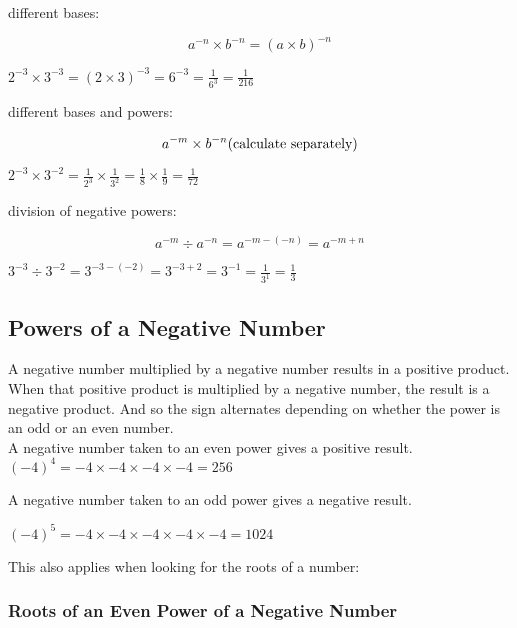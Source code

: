 \documentclass{article}
\begin{document}
different bases:
\begin{Large}
$$a^{-n}\times b^{-n}=(a\times b)^{-n}$$
\end{Large}
\begin{center}
$2^{-3}\times 3^{-3}=(2\times 3)^{-3}=6^{-3}= \frac{1}{6^3}=\frac{1}{216}$
\end{center}

different bases and powers:
\begin{Large}
$$a^{-m} \times b^{-n}\text{\normalsize (calculate separately)}$$
\end{Large}
\begin{center}
$2^{-3} \times 3^{-2}=\frac{1}{2^3} \times \frac{1}{3^2}=\frac{1}{8} \times \frac{1}{9}=\frac{1}{72}$
\end{center}

division of negative powers:
\begin{Large}
$$a^{-m} \div a^{-n}=a^{-m-(-n)}=a^{-m+n}$$
\end{Large}
\begin{center}
$3^{-3} \div 3^{-2}=3^{-3-(-2)}=3^{-3+2}=3^{-1}=\frac{1}{3^1}=\frac{1}{3}$
\end{center}

\newpage

\subsection{Powers of a Negative Number}
A negative number multiplied by a negative number results in a positive product. When that positive product is multiplied by a negative number, the result is a negative product. And so the sign alternates depending on whether the power is an odd or an even number.\\

\noindent
A negative number taken to an even power gives a positive result.\\
\indent{}$(-4)^4 = -4 \times -4 \times -4 \times -4 = 256$

\noindent
A negative number taken to an odd power gives a negative result.

$(-4)^5 = -4 \times -4 \times -4 \times -4 \times -4 = 1024$

\noindent
This also applies when looking for the roots of a number:

\subsubsection{Roots of an Even Power of a Negative Number}
\end{document}
